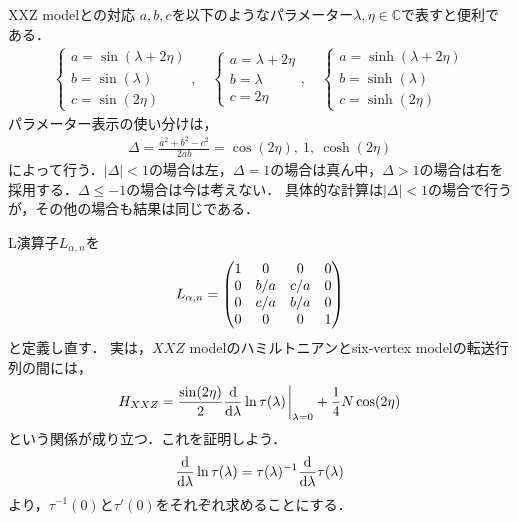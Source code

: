 \documentclass[\main/main.tex]{subfiles}
\begin{document}
\begin{frame}{XXZ modelとの対応}
    $a,b,c$を以下のようなパラメーター$\lambda,\eta \in \mathbb{C}$で表すと便利である．
    \begin{align}
        \begin{cases}
            a = \sin (\lambda + 2\eta)
            \\
            b = \sin (\lambda)
            \\
            c = \sin (2\eta)
        \end{cases},
        \quad
        \begin{cases}
            a = \lambda + 2\eta
            \\
            b = \lambda
            \\
            c = 2\eta
        \end{cases},
        \quad
        \begin{cases}
            a = \sinh (\lambda + 2\eta)
            \\
            b = \sinh (\lambda)
            \\
            c = \sinh (2\eta)
        \end{cases}
    \end{align}
    パラメーター表示の使い分けは，
    \begin{align}
        \Delta = \frac{a^2+b^2-c^2}{2ab} = \cos(2\eta),~ 1,~ \cosh(2\eta)
    \end{align}
    によって行う．$|\Delta| < 1$の場合は左，$\Delta = 1$の場合は真ん中，$\Delta > 1$の場合は右を採用する．$\Delta \le -1$の場合は今は考えない．
    具体的な計算は$|\Delta| < 1$の場合で行うが，その他の場合も結果は同じである．
\end{frame}

\begin{frame}{}
    L演算子$L_{\alpha,n}$を
    \begin{align}
          L_{\alpha,n} = \mqty(
            1&0&0&0 \\
            0&b/a&c/a&0 \\
            0&c/a&b/a&0 \\
            0&0&0&1
        )
    \end{align}
    と定義し直す．
    実は，$XXZ$ modelのハミルトニアンとsix-vertex modelの転送行列の間には，
    \begin{align}
        H_{XXZ} = \frac{\sin(2\eta)}{2}\dv{\lambda} \ln \tau(\lambda) \eval_{\lambda = 0} + \frac{1}{4}N\cos(2\eta)
    \end{align}
    という関係が成り立つ．これを証明しよう．
    \begin{align}
        \dv{\lambda}\ln\tau(\lambda) = \tau(\lambda)^{-1} \dv{\lambda}\tau(\lambda)
    \end{align}
    より，$\tau^{-1}(0)$と$\tau'(0)$をそれぞれ求めることにする．
\end{frame}
\end{document}
